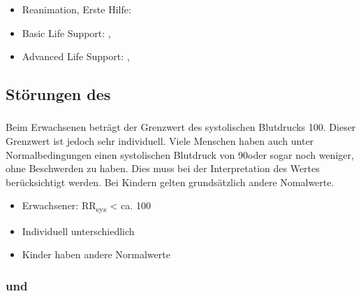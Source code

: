 \TextSlide
{\TxQuerverweise}
{\begin{itemize}
  \item Reanimation, Erste Hilfe:
  \item Basic Life Support:
  \CO{[BLS]}, 
  \item Advanced Life Support: \CO{[ALS]},
\end{itemize}}
{}
{}
{}
{}



\subsection{Störungen des }
\subsubsection{}
\label{topic:hypotonie}


 
{%
Beim Erwachsenen beträgt der  Grenzwert des
systolischen Blutdrucks 100\MmHg*. 
Dieser Grenzwert ist jedoch sehr individuell. Viele
Menschen haben auch unter Normalbedingungen einen
systolischen Blutdruck von 90\MmHg* oder sogar noch
weniger, ohne Beschwerden zu haben. Dies muss bei der
Interpretation des Wertes berücksichtigt werden. Bei Kindern
gelten grundsätzlich andere Nomalwerte.
\citep{PraxisleitAllgemeinmed6} }{%
\begin{itemize}
  \item Erwachsener: RR\textsubscript{sys} {\textless}
  ca. 100\MmHg*
  \item Individuell unterschiedlich
  \item Kinder haben andere Normalwerte
\end{itemize}
}{}{}{}


\subsubsection{ und }
\label{topic:kollaps}
\label{topic:synkope}



